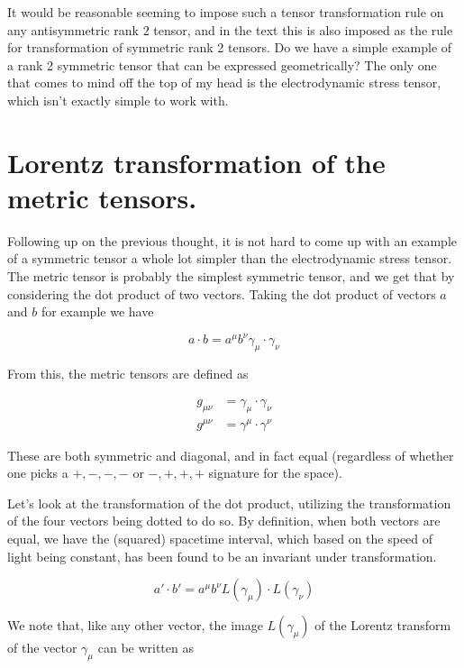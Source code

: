It would be reasonable seeming to impose such a tensor transformation rule on any antisymmetric rank 2 tensor, and in the text this is also imposed as the rule for transformation of symmetric rank 2 tensors.  Do we have a simple example of a rank 2 symmetric tensor that can be expressed geometrically?  The only one that comes to mind off the top of my head is the electrodynamic stress tensor, which isn't exactly simple to work with.

\section{Lorentz transformation of the metric tensors.}

Following up on the previous thought, it is not hard to come up with an example of a symmetric tensor a whole lot simpler than the electrodynamic stress tensor.  The metric tensor is probably the simplest symmetric tensor, and we get that by considering the dot product of two vectors.  Taking the dot product of vectors $a$ and $b$ for example we have

\begin{equation}\label{eqn:antisymmetricTensorTx:300}
a \cdot b 
= a^\mu b^\nu \gamma_\mu \cdot \gamma_\nu
\end{equation}

From this, the metric tensors are defined as

\begin{align}\label{eqn:antisymmetricTensorTx:310}
g_{\mu\nu} &= \gamma_\mu \cdot \gamma_\nu \\
g^{\mu\nu} &= \gamma^\mu \cdot \gamma^\nu
\end{align}

These are both symmetric and diagonal, and in fact equal (regardless of whether one picks a $+,-,-,-$ or $-,+,+,+$ signature for the space).

Let's look at the transformation of the dot product, utilizing the transformation of the four vectors being dotted to do so.  By definition, when both vectors are equal, we have the (squared) spacetime interval, which based on the speed of light being constant, has been found to be an invariant under transformation.

\begin{equation}\label{eqn:antisymmetricTensorTx:320}
a' \cdot b'
= 
a^\mu b^\nu L(\gamma_\mu) \cdot L(\gamma_\nu)
\end{equation}

We note that, like any other vector, the image $L(\gamma_\mu)$ of the Lorentz transform of the vector $\gamma_\mu$ can be written as

